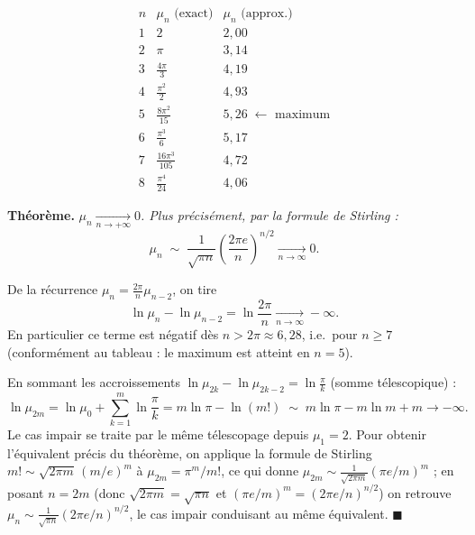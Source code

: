 
\begin{mdframed}[style=exbar]
\[
\renewcommand{\arraystretch}{1.4}
\begin{array}{c|c|c}
  n & \mu_n \text{ (exact)} & \mu_n \text{ (approx.)} \\
  \hline
  1 & 2                          & 2{,}00 \\
  2 & \pi                        & 3{,}14 \\
  3 & \tfrac{4\pi}{3}            & 4{,}19 \\
  4 & \tfrac{\pi^2}{2}           & 4{,}93 \\
  5 & \tfrac{8\pi^2}{15}         & 5{,}26 \;\leftarrow\text{ maximum} \\
  6 & \tfrac{\pi^3}{6}           & 5{,}17 \\
  7 & \tfrac{16\pi^3}{105}       & 4{,}72 \\
  8 & \tfrac{\pi^4}{24}          & 4{,}06
\end{array}
\]
\end{mdframed}


\begin{tcolorbox}[thmbox]
  \textbf{Théorème.}\enspace{}
  \textit{$\mu_n \xrightarrow[n\to+\infty]{} 0$. Plus précisément, par la formule de Stirling :}
  \[
    \mu_n \;\sim\; \frac{1}{\sqrt{\pi n}}\left(\frac{2\pi e}{n}\right)^{n/2} \xrightarrow[n\to\infty]{} 0.
  \]
\end{tcolorbox}

\begin{mdframed}[style=proofbar]
  De la récurrence $\mu_n = \frac{2\pi}{n}\mu_{n-2}$, on tire
  \[
    \ln\mu_n - \ln\mu_{n-2} = \ln\frac{2\pi}{n} \xrightarrow[n\to\infty]{} -\infty.
  \]
  En particulier ce terme est négatif dès $n > 2\pi \approx 6{,}28$, i.e.\ pour $n \geq 7$
  (conformément au tableau : le maximum est atteint en $n = 5$).

  En sommant les accroissements $\ln\mu_{2k} - \ln\mu_{2k-2} = \ln\frac{\pi}{k}$
  (somme télescopique) :
  \[
    \ln\mu_{2m} = \ln\mu_0 + \sum_{k=1}^{m}\ln\frac{\pi}{k} = m\ln\pi - \ln(m!)
    \;\sim\; m\ln\pi - m\ln m + m \to -\infty.
  \]
  Le cas impair se traite par le même télescopage depuis $\mu_1 = 2$. Pour obtenir
  l'équivalent précis du théorème, on applique la formule de Stirling
  $m! \sim \sqrt{2\pi m}\,(m/e)^m$ à $\mu_{2m} = \pi^m/m!$, ce qui donne
  $\mu_{2m} \sim \frac{1}{\sqrt{2\pi m}}(\pi e/m)^m$ ; en posant $n = 2m$ (donc
  $\sqrt{2\pi m} = \sqrt{\pi n}$ et $(\pi e/m)^m = (2\pi e/n)^{n/2}$) on retrouve
  $\mu_n \sim \frac{1}{\sqrt{\pi n}}(2\pi e/n)^{n/2}$, le cas impair conduisant au même équivalent.
  \hfill$\blacksquare$
\end{mdframed}

